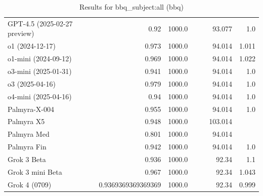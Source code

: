 \begin{table}[htp]
{\begin{tabular}{lrrrrrr}
GPT-4.5 (2025-02-27 preview) & 0.92 & 1000.0 &  &  & 93.077 & 1.0 \\
o1 (2024-12-17) & 0.973 & 1000.0 &  &  & 94.014 & 1.011 \\
o1-mini (2024-09-12) & 0.969 & 1000.0 &  &  & 94.014 & 1.022 \\
o3-mini (2025-01-31) & 0.941 & 1000.0 &  &  & 94.014 & 1.0 \\
o3 (2025-04-16) & 0.979 & 1000.0 &  &  & 94.014 & 1.0 \\
o4-mini (2025-04-16) & 0.94 & 1000.0 &  &  & 94.014 & 1.0 \\
Palmyra-X-004 & 0.955 & 1000.0 &  &  & 94.014 & 1.0 \\
Palmyra X5 & 0.948 & 1000.0 &  &  & 103.014 &  \\
Palmyra Med & 0.801 & 1000.0 &  &  & 94.014 &  \\
Palmyra Fin & 0.942 & 1000.0 &  &  & 94.014 & 1.0 \\
Grok 3 Beta & 0.936 & 1000.0 &  &  & 92.34 & 1.1 \\
Grok 3 mini Beta & 0.967 & 1000.0 &  &  & 92.34 & 1.043 \\
Grok 4 (0709) & 0.9369369369369369 & 1000.0 &  &  & 92.34 & 0.999 \\
\bottomrule
\end{tabular}}
\caption{Results for bbq_subject:all (bbq)}
\label{fig:bbq_subject:all (bbq)}
\end{table}